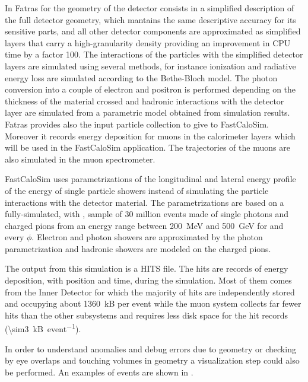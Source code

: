 In Fatras for the geometry of the detector consists in a simplified description of the full detector geometry, which mantains the same descriptive accuracy for its sensitive parts, and all other detector components are approximated as simplified layers that carry a high-granularity density providing an improvement in CPU time by a factor \num{100}. The interactions of the particles with the simplified detector layers are simulated using several methods, for instance ionization and radiative energy loss are simulated according to the Bethe-Bloch model. The photon conversion into a couple of electron and positron is performed depending on the thickness of the material crossed and hadronic interactions with the detector layer are simulated from a parametric model obtained from \geant simulation results. Fatras provides also the input particle collection to give to FastCaloSim. Moreover it records energy deposition for muons in the calorimeter layers which will be used in the FastCaloSim application. The trajectories of the muons are also simulated in the muon spectrometer.

FastCaloSim uses parametrizations of the longitudinal and lateral energy profile of the energy of single particle showers instead of simulating the particle interactions with the detector material. The parametrizations are based on a fully-simulated, with \geant, sample of 30 million events made of single photons and charged pions from an energy range between \SI{200}{\MeV} and \SI{500}{\GeV} for  and every $\phi$. Electron and photon showers are approximated by the photon parametrization and hadronic showers are modeled on the charged pions.

The output from this simulation is a HITS file. The hits are records of energy deposition, with position and time, during the simulation. Most of them comes from the Inner Detector for which the majority of hits are independently stored and occupying about \SI{1360}{kB} per event while the muon system collects far fewer hits than the other subsystems and requires less disk space for the hit records (\SI{\sim3}{kB\per event}).

In order to understand anomalies and debug errors due to geometry or checking by eye overlaps and touching volumes in geometry a visualization step could also be performed. An examples of events are shown in \Fig{\ref{fig:simulation}}.

